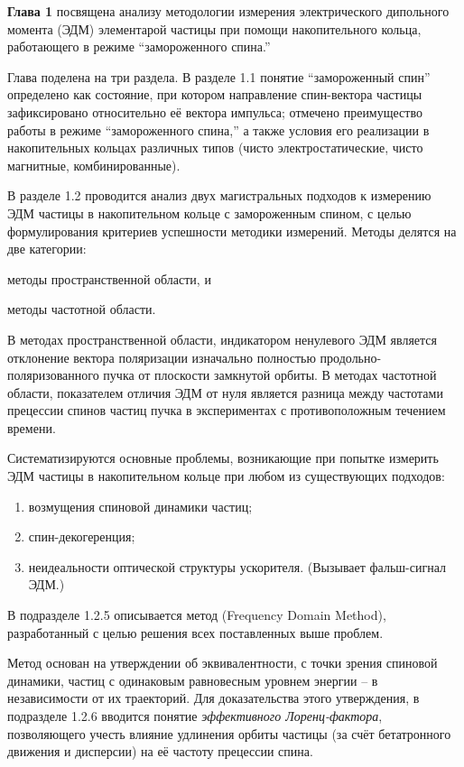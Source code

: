 
\textbf{Глава 1} посвящена анализу методологии измерения электрического дипольного момента (ЭДМ) 
элементарой частицы при помощи накопительного кольца, работающего в режиме ``замороженного спина.'' 

Глава поделена на три раздела. В разделе 1.1 понятие ``замороженный спин'' определено как состояние, при котором
направление спин-вектора частицы зафиксировано относительно её вектора импульса; 
отмечено преимущество работы в режиме ``замороженного спина,'' а также условия его реализации 
в накопительных кольцах различных типов (чисто электростатические, чисто магнитные, комбинированные).

В разделе 1.2 проводится анализ двух магистральных подходов к измерению ЭДМ частицы в накопительном кольце
с замороженным спином, с целью формулирования критериев успешности методики измерений. Методы
делятся на две категории: 
\begin{enumerate*}[(1)]
	\item методы пространственной области, и 
	\item методы частотной области.
\end{enumerate*}
В методах пространственной области, индикатором ненулевого ЭДМ является отклонение вектора поляризации 
изначально полностью продольно-поляризованного пучка от плоскости замкнутой орбиты. В методах частотной
области, показателем отличия ЭДМ от нуля является разница между частотами прецессии спинов частиц пучка в 
экспериментах с противоположным течением времени.

Систематизируются основные проблемы, возникающие при попытке измерить ЭДМ частицы 
в накопительном кольце при любом из существующих подходов:
\begin{enumerate}[(1)]
	\item возмущения спиновой динамики частиц;
	\item спин-декогеренция;
	\item неидеальности оптической структуры ускорителя. (Вызывает фальш-сигнал ЭДМ.)
\end{enumerate}

В подразделе 1.2.5 описывается метод (Frequency Domain Method), разработанный с целью решения 
всех поставленных выше проблем.

Метод основан на утверждении об эквивалентности, с точки зрения спиновой динамики, 
частиц с одинаковым равновесным уровнем энергии -- в независимости от их траекторий. 
Для доказательства этого утверждения, в подразделе 1.2.6 вводится понятие \emph{эффективного Лоренц-фактора}, 
позволяющего учесть влияние удлинения орбиты частицы (за счёт бетатронного движения и дисперсии)
на её частоту прецессии спина.


